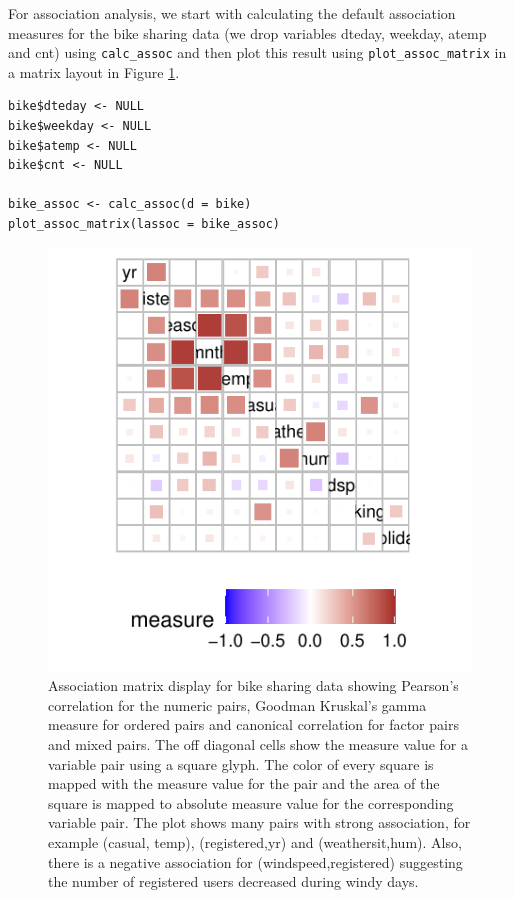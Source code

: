 For association analysis, we start with calculating the default association measures for the bike sharing data (we drop variables dteday, weekday, atemp and cnt) using \texttt{calc\_assoc} and then plot this result using \texttt{plot\_assoc\_matrix} in a matrix layout in Figure \ref{fig:assoc-matrix-bike}.

\begin{verbatim}
bike$dteday <- NULL 
bike$weekday <- NULL
bike$atemp <- NULL
bike$cnt <- NULL

bike_assoc <- calc_assoc(d = bike)
plot_assoc_matrix(lassoc = bike_assoc)
\end{verbatim}

\begin{figure}

{\centering \includegraphics{rjpaperCHMar22_files/figure-latex/assoc-matrix-bike-1} 

}

\caption{Association matrix display for bike sharing data showing Pearson's correlation for the numeric pairs, Goodman Kruskal's gamma measure for ordered pairs and canonical correlation for factor pairs and mixed pairs. The off diagonal cells show the measure value for a variable pair using a square glyph. The color of every square is mapped with the measure value for the pair and the area of the square is mapped to absolute measure value for the corresponding variable pair. The plot shows many pairs with strong association, for example (casual, temp), (registered,yr) and (weathersit,hum). Also, there is a negative association for (windspeed,registered) suggesting the number of registered users decreased during windy days.}\label{fig:assoc-matrix-bike}
\end{figure}

